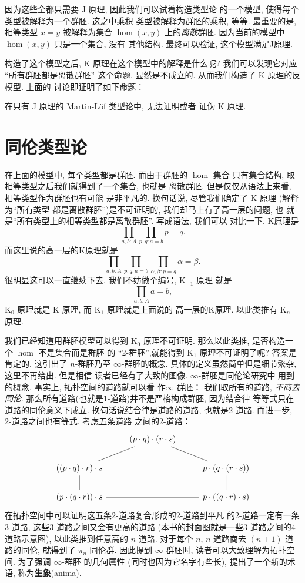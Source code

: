 因为这些全都只需要 J 原理, 因此我们可以试着构造类型论
的一个模型, 使得每个类型被解释为一个群胚. 这之中乘积
类型被解释为群胚的乘积, 等等. 最重要的是, 相等类型
\(x = y\) 被解释为集合 \(\hom(x,y)\) 上的\emph{离散}群胚.
因为当前的模型中 \(\hom(x,y)\) 只是一个集合, 没有
其他结构. 最终可以验证, 这个模型满足J原理.

构造了这个模型之后, K 原理在这个模型中的解释是什么呢?
我们可以发现它对应 “所有群胚都是离散群胚” 这个命题.
显然是不成立的. 从而我们构造了 K 原理的反模型. 上面的
讨论即证明了如下命题：
\begin{theorem}
在只有 J 原理的 Martin-L\"of 类型论中, 无法证明或者
证伪 K 原理.
\end{theorem}

\section{同伦类型论}
在上面的模型中, 每个类型都是群胚. 而由于群胚的 \(\hom\) 集合
只有集合结构, 取相等类型之后我们就得到了一个集合, 也就是
离散群胚. 但是仅仅从语法上来看, 相等类型作为群胚也有可能
是非平凡的. 换句话说, 尽管我们确定了 K 原理 (解释为“所有类型
都是离散群胚”)是不可证明的, 我们却马上有了高一层的问题, 也
就是“所有类型上的相等类型都是离散群胚”. 写成语法, 我们可以
对比一下. K原理是
\[\prod_{a,b : A} \prod_{p,q:a=b} p = q.\]
而这里说的高一层的K原理就是
\[\prod_{a,b : A} \prod_{p,q:a=b} \prod_{\alpha,\beta:p=q} \alpha = \beta.\]
很明显这可以一直继续下去. 我们不妨做个编号, K\(_{-1}\) 原理
就是
\[\prod_{a,b : A} a = b,\]
K\(_0\) 原理就是 K 原理, 而 K\(_1\) 原理就是上面说的
高一层的K原理. 以此类推有 K\(_n\) 原理.

我们已经知道用群胚模型可以得到 K\(_0\) 原理不可证明.
那么以此类推, 是否构造一个 \(\hom\) 不是集合而是群胚
的 “2-群胚”,就能得到 K\(_1\) 原理不可证明了呢? 答案是
肯定的. 这引出了 \(n\)-群胚乃至 \(\infty\)-群胚的概念.
具体的定义虽然简单但是细节繁杂, 这里不再给出. 但是相信
读者已经有了大致的图像. \(\infty\)-群胚是同伦论研究中
用到的概念. 事实上, 拓扑空间的道路就可以看
作\(\infty\)-群胚： 我们取所有的道路, \emph{不商去同伦}.
那么所有道路(也就是1-道路)并不是严格构成群胚, 因为结合律
等等式只在道路的同伦意义下成立. 换句话说结合律是道路的道路,
也就是2-道路. 而进一步, 2-道路之间也有等式. 考虑五条道路
之间的2-道路：
\[\begin{tikzcd}
& {(p\cdot q)\cdot (r\cdot s)} \\
{((p\cdot q)\cdot r)\cdot s} && {p\cdot (q\cdot (r\cdot s))} \\
{(p\cdot (q\cdot r))\cdot s} && {p\cdot ((q\cdot r)\cdot s)}
\arrow[no head, from=2-1, to=1-2]
\arrow[no head, from=2-1, to=3-1]
\arrow[no head, from=3-1, to=3-3]
\arrow[no head, from=3-3, to=2-3]
\arrow[no head, from=2-3, to=1-2]
\end{tikzcd}\]
在拓扑空间中可以证明这五条2-道路复合形成的2-道路到平凡
的2-道路一定有一条3-道路, 这些3-道路之间又会有更高的道路
(本书的封面图就是一些3-道路之间的4-道路示意图),
以此类推到任意高的 \(n\)-道路.
对于每个 \(n\), \(n\)-道路商去 \((n+1)\)-道路的同伦,
就得到了 \(\pi_n\) 同伦群. 因此提到 \(\infty\)-群胚时,
读者可以大致理解为拓扑空间. 为了强调 \(\infty\)-群胚
的几何属性 (同时也因为它名字有些长), 提出了一个新的术语,
称为\textbf{生象}(anima).


